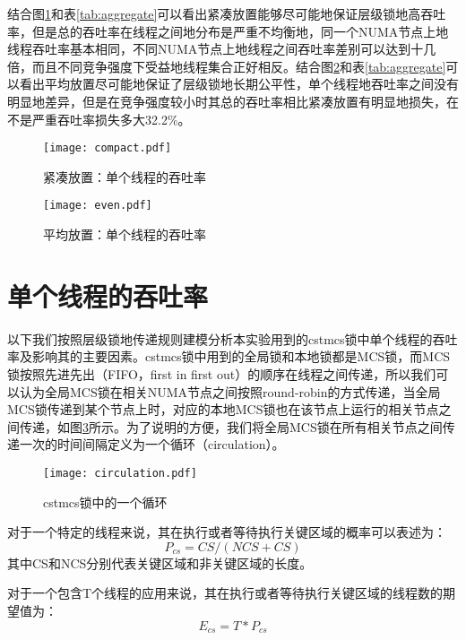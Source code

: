 结合图\ref{Fig:compact}和表\ref{tab:aggregate}可以看出紧凑放置能够尽可能地保证层级锁地高吞吐率，但是总的吞吐率在线程之间地分布是严重不均衡地，同一个NUMA节点上地线程吞吐率基本相同，不同NUMA节点上地线程之间吞吐率差别可以达到十几倍，而且不同竞争强度下受益地线程集合正好相反。结合图\ref{Fig:even}和表\ref{tab:aggregate}可以看出平均放置尽可能地保证了层级锁地长期公平性，单个线程地吞吐率之间没有明显地差异，但是在竞争强度较小时其总的吞吐率相比紧凑放置有明显地损失，在不是严重吞吐率损失多大32.2\%。

\begin{figure}[t]
	\centering
	\texttt{[image: compact.pdf]}
	\caption{紧凑放置：单个线程的吞吐率}
	\label{Fig:compact}
\end{figure}

\begin{figure}[t]
	\centering
	\texttt{[image: even.pdf]}
	\caption{平均放置：单个线程的吞吐率}
	\label{Fig:even}
\end{figure}

\section{单个线程的吞吐率}
以下我们按照层级锁地传递规则建模分析本实验用到的cstmcs锁中单个线程的吞吐率及影响其的主要因素。cstmcs锁中用到的全局锁和本地锁都是MCS锁，而MCS锁按照先进先出（FIFO，first in first out）的顺序在线程之间传递，所以我们可以认为全局MCS锁在相关NUMA节点之间按照round-robin的方式传递，当全局MCS锁传递到某个节点上时，对应的本地MCS锁也在该节点上运行的相关节点之间传递，如图\ref{Fig:circulation}所示。为了说明的方便，我们将全局MCS锁在所有相关节点之间传递一次的时间间隔定义为一个循环（circulation）。

\begin{figure}[t]
	\centering
	\texttt{[image: circulation.pdf]}
	\caption{cstmcs锁中的一个循环}
	\label{Fig:circulation}
\end{figure}

对于一个特定的线程来说，其在执行或者等待执行关键区域的概率可以表述为：
\begin{equation}\label{Eq:pro}
     P_{cs} = CS / (NCS + CS)
\end{equation}
其中CS和NCS分别代表关键区域和非关键区域的长度。

对于一个包含T个线程的应用来说，其在执行或者等待执行关键区域的线程数的期望值为：
\begin{equation}\label{Eq:expectation}
     E_{cs} = T * P_{cs}
\end{equation}

